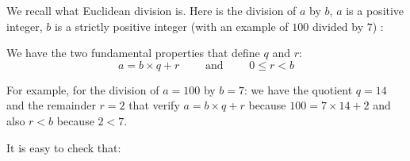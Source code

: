 \documentclass[11pt,class=report,crop=false]{standalone}
\begin{document}





\begin{cours}[Arithmetic]

\index{\ci{//}}
\index{\ci{\%}}

We recall what Euclidean division is. Here is the division of $a$ by $b$, $a$ is a positive integer, $b$ is a strictly positive integer (with an example of $100$ divided by $7$) :


We have the two fundamental properties that define $q$ and $r$:
$$a = b \times q  + r \qquad \text{ and } \qquad 0 \le r < b$$

For example, for the division of $a=100$ by $b=7$: we have the quotient $q=14$ and the remainder $r=2$ that verify $a = b \times q  + r$ because $100 = 7 \times 14 + 2$ and also $r<b$ because $2<7$.


It is easy to check that:

\end{cours}


\end{document}
